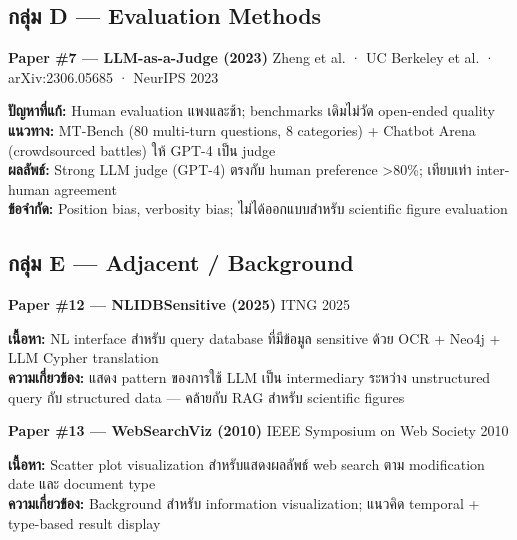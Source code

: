 \documentclass[10pt,a4paper]{article}
\begin{document}
\vspace{10pt}
\subsection*{\textcolor{accent-teal}{กลุ่ม D — Evaluation Methods}}

\textbf{Paper \#7 — LLM-as-a-Judge (2023)}
\hfill {\color{muted}\small Zheng et al. · UC Berkeley et al. · arXiv:2306.05685 · NeurIPS 2023}

\begin{infobox}
\textbf{ปัญหาที่แก้:} Human evaluation แพงและช้า; benchmarks เดิมไม่วัด open-ended quality\\
\textbf{แนวทาง:} MT-Bench (80 multi-turn questions, 8 categories) + Chatbot Arena (crowdsourced battles) ให้ GPT-4 เป็น judge\\
\textbf{ผลลัพธ์:} Strong LLM judge (GPT-4) ตรงกับ human preference >80\%; เทียบเท่า inter-human agreement\\
\textbf{ข้อจำกัด:} Position bias, verbosity bias; ไม่ได้ออกแบบสำหรับ scientific figure evaluation
\end{infobox}

\vspace{10pt}
\subsection*{\textcolor{accent-teal}{กลุ่ม E — Adjacent / Background}}

\textbf{Paper \#12 — NLIDBSensitive (2025)}
\hfill {\color{muted}\small ITNG 2025}

\begin{infobox}
\textbf{เนื้อหา:} NL interface สำหรับ query database ที่มีข้อมูล sensitive ด้วย OCR + Neo4j + LLM Cypher translation\\
\textbf{ความเกี่ยวข้อง:} แสดง pattern ของการใช้ LLM เป็น intermediary ระหว่าง unstructured query กับ structured data — คล้ายกับ RAG สำหรับ scientific figures
\end{infobox}

\vspace{6pt}
\textbf{Paper \#13 — WebSearchViz (2010)}
\hfill {\color{muted}\small IEEE Symposium on Web Society 2010}

\begin{infobox}
\textbf{เนื้อหา:} Scatter plot visualization สำหรับแสดงผลลัพธ์ web search ตาม modification date และ document type\\
\textbf{ความเกี่ยวข้อง:} Background สำหรับ information visualization; แนวคิด temporal + type-based result display
\end{infobox}
\end{document}
